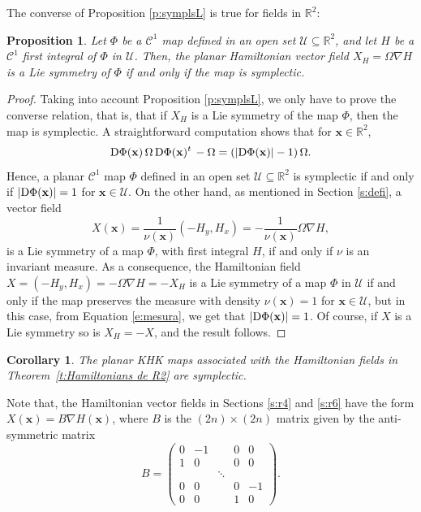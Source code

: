 \documentclass[11pt]{article}
\newtheorem {proposition} [theorem]{Proposition}
\newtheorem {corollary} [theorem]{Corollary}
\begin{document}
The converse of Proposition \ref{p:symplsL} is true for fields in $\mathbb{R}^2$:

\begin{proposition}\label{p:corolpla}
Let $\Phi$ be a $\mathcal{C}^1$ map defined in an open set $\mathcal{U}\subseteq \mathbb{R}^2$, and let $H$ be a $\mathcal{C}^1$ first integral of $\Phi$ in $\mathcal{U}$. Then, the \emph{planar} Hamiltonian vector field $X_H=\Omega \nabla H$ is a Lie symmetry of $\Phi$ if and only if the map is symplectic.
\end{proposition}

\begin{proof}
Taking into account Proposition \ref{p:symplsL}, we only have to prove the converse relation, that is, that if $X_H$ is a Lie symmetry  of the map $\Phi$, then the map is symplectic. A straightforward computation shows that for $\mathbf{x}\in\mathbb{R}^2$,
$$
{\mathrm D}\Phi({\bf{x}})\,\Omega\,{\mathrm D}\Phi({\bf{x}})^t\,-\Omega=(|\mathrm{D}\Phi({\bf{x}})|-1)\,\Omega.
$$
Hence, a planar $\mathcal{C}^1$ map $\Phi$ defined in an open set $\mathcal{U}\subseteq \mathbb{R}^2$ is symplectic if and only if $|\mathrm{D}\Phi({\bf{x}})|=1$ for $\mathbf{x}\in\mathcal{U}$. On the other hand, as mentioned in Section \ref{s:defi}, a vector field
 $$X(\mathbf{x})=\frac{1}{\nu(\mathbf{x})}\left(-H_y,H_x\right)=-\frac{1}{\nu(\mathbf{x})}\Omega \nabla H,$$ is a Lie symmetry of a map $\Phi$, with first integral $H$, if and only if $\nu$ is
an invariant measure.  As a consequence, the  Hamiltonian field  $X=(-H_y,H_x)=-\Omega\nabla H=-X_H$ is a Lie symmetry of a map $\Phi$ in $\mathcal{U}$ if and only if the map preserves the measure with density $\nu(\mathbf{x})= 1$ for $\mathbf{x}\in\mathcal{U}$, but in this case, from Equation \eqref{e:mesura}, we get that $|\mathrm{D}\Phi({\bf{x}})|= 1$. Of course, if $X$ is a Lie symmetry so is $X_H=-X$, and the result follows.
\end{proof}



\begin{corollary}\label{c:simplecticr2} The planar KHK maps associated with the Hamiltonian fields in Theorem~\ref{t:Hamiltonians de R2}  are symplectic.
\end{corollary}



\medskip


Note that, the Hamiltonian vector fields in Sections \ref{s:r4} and \ref{s:r6} have the form $X(\mathbf{x})=B\nabla H(\mathbf{x})$, where $B$ is the $(2n)\times(2n)$ matrix given  by the anti-symmetric matrix
\begin{equation}\label{e:B}
B=\left(\begin{array}{crccr}
0 & -1 & & 0 & 0\\
1 & 0 & &0 & 0\\
& & \ddots & &\\
0 & 0 & &0 & -1\\
0 & 0 & & 1 & 0
\end{array}\right).
\end{equation}
\end{document}
